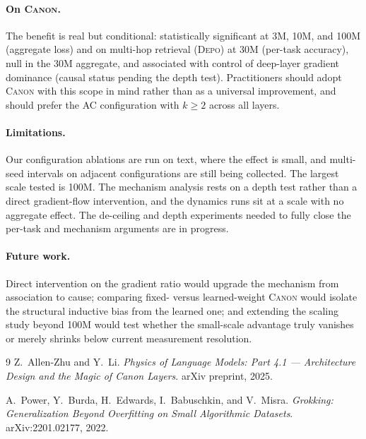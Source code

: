 \documentclass{article}
\newcommand{\Canon}{\textsc{Canon}\xspace}
\newcommand{\Depo}{\textsc{Depo}\xspace}
\begin{document}
\paragraph{On \Canon.} The benefit is real but conditional: statistically significant at 3M, 10M,
and 100M (aggregate loss) and on multi-hop retrieval (\Depo) at 30M (per-task accuracy), null in
the 30M aggregate, and associated with control of deep-layer gradient dominance (causal status
pending the depth test). Practitioners should adopt \Canon with this scope in mind rather than as
a universal improvement, and should prefer the AC configuration with $k\ge2$ across all layers.

\paragraph{Limitations.} Our configuration ablations are run on text, where the effect is small,
and multi-seed intervals on adjacent configurations are still being collected. The largest scale
tested is 100M. The mechanism analysis rests on a depth test rather than a direct gradient-flow
intervention, and the dynamics runs sit at a scale with no aggregate effect. The de-ceiling and
depth experiments needed to fully close the per-task and mechanism arguments are in progress.

\paragraph{Future work.} Direct intervention on the gradient ratio would upgrade the mechanism
from association to cause; comparing fixed- versus learned-weight \Canon would isolate the
structural inductive bias from the learned one; and extending the scaling study beyond 100M would
test whether the small-scale advantage truly vanishes or merely shrinks below current measurement
resolution.

\begin{thebibliography}{9}
  Z.\ Allen-Zhu and Y.\ Li.
  \emph{Physics of Language Models: Part 4.1 --- Architecture Design and the Magic of Canon
  Layers}.
  arXiv preprint, 2025.

  A.\ Power, Y.\ Burda, H.\ Edwards, I.\ Babuschkin, and V.\ Misra.
  \emph{Grokking: Generalization Beyond Overfitting on Small Algorithmic Datasets}.
  arXiv:2201.02177, 2022.
\end{thebibliography}
\end{document}
